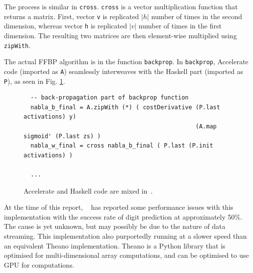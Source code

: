 The process is similar in \texttt{cross}. \texttt{cross} is a vector multiplication function that returns a matrix. First, vector \texttt{v} is replicated $|h|$ number of times in the second dimension, whereas vector \texttt{h} is replicated $|v|$ number of times in the first dimension. The resulting two matrices are then element-wise multiplied using \texttt{zipWith}. 

The actual FFBP algorithm is in the function \texttt{backprop}. In \texttt{backprop}, Accelerate code (imported as \texttt{A}) seamlessly interweaves with the Haskell part (imported as \texttt{P}), as seen in Fig. \ref{fig:acc-functions4}.
\begin{figure}
  \begin{lstlisting}
  -- back-propagation part of backprop function
  nabla_b_final = A.zipWith (*) ( costDerivative (P.last activations) y) 
                                                 (A.map sigmoid' (P.last zs) )
  nabla_w_final = cross nabla_b_final ( P.last (P.init activations) )
  
  ...
  \end{lstlisting}
  \caption{Accelerate and Haskell code are mixed in~\cite{Eve16}.}
  \label{fig:acc-functions4}
\end{figure}

At the time of this report, ~\cite{Eve16} has reported some performance issues with this implementation with the success rate of digit prediction at approximately 50\%. The cause is yet unknown, but may possibly be due to the nature of data streaming. This implementation also purportedly running at a slower speed than an equivalent Theano implementation. Theano is a Python library that is optimised for multi-dimensional array computations, and can be optimised to use GPU for computations.
